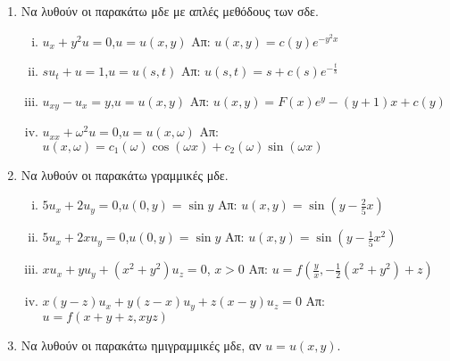 


\thispagestyle{empty}



\begin{center}
\end{center}

\vspace{\baselineskip}

\begin{enumerate}
  \item Να λυθούν οι παρακάτω μδε με απλές μεθόδους των σδε.
    \begin{enumerate}[i)]
      \item $u_{x}+y^{2}u=0$,\quad $u=u(x,y)$ \hfill Απ: $u(x,y)=c(y)e^{-y^{2}x}$
      \item $su_{t}+u=1$,\quad $u=u(s,t)$ \hfill Απ: $u(s,t)=s+c(s)e^{-\frac{t}{s}}$
      \item $u_{xy}-u_{x}=y$,\quad $u=u(x,y)$ \hfill Απ: $u(x,y)=F(x)e^{y}-(y+1)x+c(y)$
      \item $u_{xx}+\omega^{2}u=0$,\quad $u=u(x,\omega)$ \hfill Απ: $u(x,\omega)=c_{1}(\omega)\cos(\omega x)+c_{2}(\omega)\sin(\omega x)$
    \end{enumerate}

\item Να λυθούν οι παρακάτω γραμμικές μδε.

  \begin{enumerate}[i)]
    \item $5u_{x}+2u_{y}=0$,\quad $u(0,y)=\sin y$  \hfill Απ: $u(x,y)=\sin(y-\frac{2}{5}x)$
    \item $5u_{x}+2xu_{y}=0$,\quad $u(0,y)=\sin y$ \hfill Απ: $u(x,y)=\sin(y-\frac{1}{5}x^{2})$
    \item $xu_{x}+yu_{y}+(x^{2}+y^{2})u_{z}=0$, \quad $x>0$ \hfill Απ: $u=f(\frac{y}{x},-\frac{1}{2}(x^{2}+y^{2})+z)$
    \item $x(y-z)u_{x}+y(z-x)u_{y}+z(x-y)u_{z}=0$ \hfill Απ: $u=f(x+y+z,xyz)$
  \end{enumerate}

\item Να λυθούν οι παρακάτω ημιγραμμικές μδε, αν $u=u(x,y)$.


\end{enumerate}
